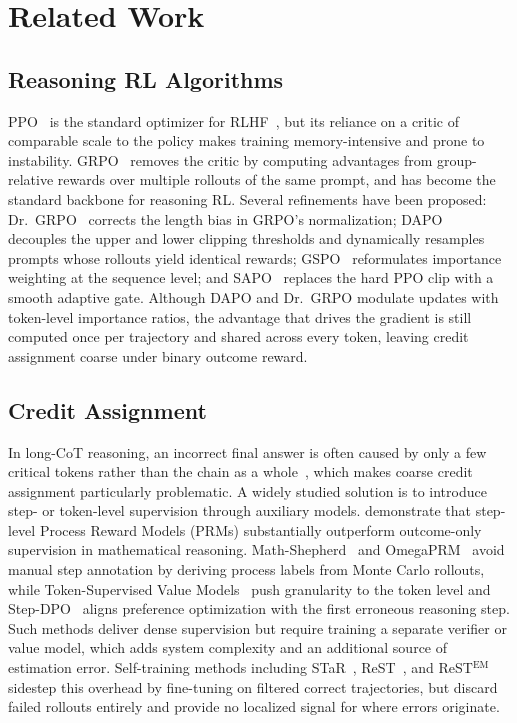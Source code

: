 \documentclass{article}
\begin{document}





\appendix
\section{Related Work}

\subsection{Reasoning RL Algorithms}

PPO~\citep{ppo} is the standard optimizer for RLHF~\citep{NEURIPS2022_b1efde53}, but its reliance on a critic of comparable scale to the policy makes training memory-intensive and prone to instability. GRPO~\citep{shao2024deepseekmath} removes the critic by computing advantages from group-relative rewards over multiple rollouts of the same prompt, and has become the standard backbone for reasoning RL. Several refinements have been proposed: Dr.~GRPO~\citep{liu2025drgrpo} corrects the length bias in GRPO's normalization; DAPO~\citep{yu2025dapo} decouples the upper and lower clipping thresholds and dynamically resamples prompts whose rollouts yield identical rewards; GSPO~\citep{zhang2025gspo} reformulates importance weighting at the sequence level; and SAPO~\citep{wang2025sapo} replaces the hard PPO clip with a smooth adaptive gate. Although DAPO and Dr.~GRPO modulate updates with token-level importance ratios, the advantage that drives the gradient is still computed once per trajectory and shared across every token, leaving credit assignment coarse under binary outcome reward.

\subsection{Credit Assignment}

In long-CoT reasoning, an incorrect final answer is often caused by only a few critical tokens rather than the chain as a whole~\citep{lin2025critical}, which makes coarse credit assignment particularly problematic.
A widely studied solution is to introduce step- or token-level supervision through auxiliary models. \citet{lightman2023letsverify} demonstrate that step-level Process Reward Models (PRMs) substantially outperform outcome-only supervision in mathematical reasoning. Math-Shepherd~\citep{wang2024mathshepherdverifyreinforcellms} and OmegaPRM~\citep{luo2024automated} avoid manual step annotation by deriving process labels from Monte Carlo rollouts, while Token-Supervised Value Models~\citep{lee2025tvm} push granularity to the token level and Step-DPO~\citep{xu-etal-2025-full} aligns preference optimization with the first erroneous reasoning step. Such methods deliver dense supervision but require training a separate verifier or value model, which adds system complexity and an additional source of estimation error. Self-training methods including STaR~\citep{NEURIPS2022_639a9a17}, ReST~\citep{Gulcehre2023ReinforcedS}, and ReST$^{\text{EM}}$~\citep{Singh2023BeyondHD} sidestep this overhead by fine-tuning on filtered correct trajectories, but discard failed rollouts entirely and provide no localized signal for where errors originate.
\end{document}
